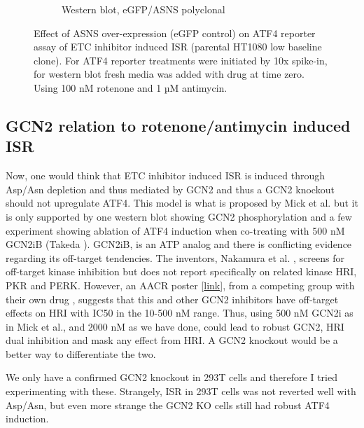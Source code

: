 \begin{figure}[ht]
\begin{subfigure}[b]{0.6\textwidth}
         \caption{Western blot, eGFP/ASNS polyclonal}
         \label{fig:sapp:ISR:HT1080_ISR_ASNS_OE}
     \end{subfigure}
        \caption[ASNS OE, rotenone/antimycin induced ISR]{
        Effect of ASNS over-expression (eGFP control) on ATF4 reporter assay of ETC inhibitor induced ISR (parental HT1080 low baseline clone).
        For ATF4 reporter treatments were initiated by 10x spike-in, for western blot fresh media was added with drug at time zero.
        Using 100 nM rotenone and 1 µM antimycin.
        }
        \label{fig:sapp:ISR:ASNS_ISR}
\end{figure}







\FloatBarrier
\subsection{GCN2 relation to rotenone/antimycin induced ISR}
Now, one would think that ETC inhibitor induced ISR is induced through Asp/Asn depletion and thus mediated by GCN2 and thus a GCN2 knockout should not upregulate ATF4.
This model is what is proposed by Mick et al. \cite{Mick2020-kf} but it is only supported by one western blot showing GCN2 phosphorylation and a few experiment showing ablation of ATF4 induction when co-treating with 500 nM GCN2iB (Takeda \cite{Nakamura2018-mt}).
GCN2iB, is an ATP analog and there is conflicting evidence regarding its off-target tendencies.
The inventors, Nakamura et al. \cite{Nakamura2018-mt}, screens for off-target kinase inhibition but does not report specifically on related kinase HRI, PKR and PERK.
However, an AACR poster [\href{https://rapt.com/wp-content/uploads/2019/04/FLX-Bio-GCN2-poster-AACR-2019.pdf}{link}], from a competing group with their own drug \cite{Jackson2022-wv}, suggests that this and other GCN2 inhibitors have off-target effects on HRI with IC50 in the 10-500 nM range.
Thus, using 500 nM GCN2i as in Mick et al., and 2000 nM as we have done, could lead to robust GCN2, HRI dual inhibition and mask any effect from HRI.
A GCN2 knockout would be a better way to differentiate the two.

We only have a confirmed GCN2 knockout in 293T cells and therefore I tried experimenting with these.
Strangely, ISR in 293T cells was not reverted well with Asp/Asn, but even more strange the GCN2 KO cells still had robust ATF4 induction.


